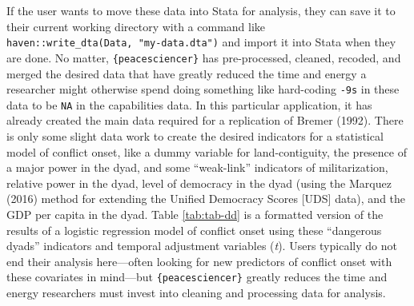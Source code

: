 \documentclass[
  11pt,
]{article}
\begin{document}
If the user wants to move these data into Stata for analysis, they can save it to their current working directory with a command like \texttt{haven::write\_dta(Data,\ "my-data.dta")} and import it into Stata when they are done. No matter, \texttt{\{peacesciencer\}} has pre-processed, cleaned, recoded, and merged the desired data that have greatly reduced the time and energy a researcher might otherwise spend doing something like hard-coding \texttt{-9s} in these data to be \texttt{NA} in the capabilities data. In this particular application, it has already created the main data required for a replication of Bremer (1992). There is only some slight data work to create the desired indicators for a statistical model of conflict onset, like a dummy variable for land-contiguity, the presence of a major power in the dyad, and some ``weak-link'' indicators of militarization, relative power in the dyad, level of democracy in the dyad (using the Marquez (2016) method for extending the Unified Democracy Scores {[}UDS{]} data), and the GDP per capita in the dyad. Table \ref{tab:tab-dd} is a formatted version of the results of a logistic regression model of conflict onset using these ``dangerous dyads'' indicators and temporal adjustment variables (\emph{t}). Users typically do not end their analysis here---often looking for new predictors of conflict onset with these covariates in mind---but \texttt{\{peacesciencer\}} greatly reduces the time and energy researchers must invest into cleaning and processing data for analysis.
\end{document}
